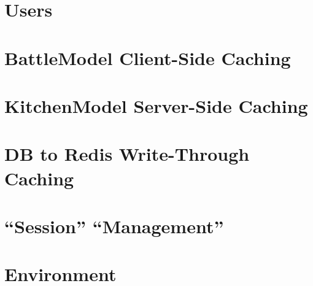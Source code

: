 \documentclass{article}
\begin{document}
\section*{Users}



\newpage

\section*{BattleModel Client-Side Caching}



\newpage

\section*{KitchenModel Server-Side Caching}



\newpage

\section*{DB to Redis Write-Through Caching}



\newpage

\section*{``Session'' ``Management''}



\newpage

\section*{Environment}


\end{document}
